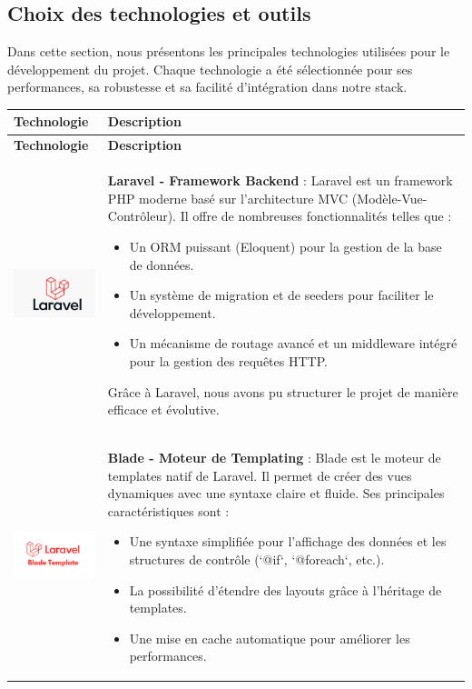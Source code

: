 \subsection{Choix des technologies et outils}
Dans cette section, nous présentons les principales technologies utilisées pour le développement du projet. Chaque technologie a été sélectionnée pour ses performances, sa robustesse et sa facilité d'intégration dans notre stack.

\begin{longtable}{|m{4cm}|m{10cm}|}
    \hline
    \textbf{Technologie} & \textbf{Description} \\
    \hline
    \endfirsthead

    \hline
    \textbf{Technologie} & \textbf{Description} \\
    \hline
    \endhead

    \hline
    \endfoot

    \hline
    \includegraphics[width=3cm]{images/logo/laravel.png} & 
    \textbf{Laravel - Framework Backend} : Laravel est un framework PHP moderne basé sur l'architecture MVC (Modèle-Vue-Contrôleur). Il offre de nombreuses fonctionnalités telles que :  
    \begin{itemize}
        \item Un ORM puissant (Eloquent) pour la gestion de la base de données.
        \item Un système de migration et de seeders pour faciliter le développement.
        \item Un mécanisme de routage avancé et un middleware intégré pour la gestion des requêtes HTTP.
    \end{itemize}
    Grâce à Laravel, nous avons pu structurer le projet de manière efficace et évolutive. \\
    \hline

    \includegraphics[width=3cm]{images/logo/blade.png} & 
    \textbf{Blade - Moteur de Templating} : Blade est le moteur de templates natif de Laravel. Il permet de créer des vues dynamiques avec une syntaxe claire et fluide. Ses principales caractéristiques sont :
    \begin{itemize}
        \item Une syntaxe simplifiée pour l'affichage des données et les structures de contrôle (`@if`, `@foreach`, etc.).
        \item La possibilité d'étendre des layouts grâce à l'héritage de templates.
        \item Une mise en cache automatique pour améliorer les performances.
    \end{itemize}\\
    \hline


\end{longtable}
